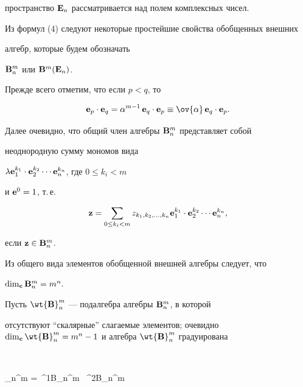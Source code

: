 пространство ${\bold E}_n$ рассматривается над полем комплексных чисел.





Из формул (4) следуют некоторые простейшие свойства обобщенных внешних


алгебр, которые будем обозначать


${\bold B}_n^m$ или ${\bold B}^m({\bold E}_n)$.


Прежде всего отметим, что если $p<q$, то


\begin{equation}


{\bold e}_p\cdot {\bold e}_q = \alpha^{m-1}\,{\bold e}_q\cdot {\bold e}_p


\equiv \ov{\alpha}\, {\bold e}_q\cdot {\bold e}_p.


\end{equation}


Далее очевидно, что общий член алгебры ${\bold B}_n^m $ представляет собой


неоднородную сумму мономов вида


$\lambda {\bold e}_1^{k_1}\cdot{\bold e}_2^{k_2}


\dotsb{\bold e}_n^{k_n}$, где $0\le k_i <m$


и ${\bold e}^0 = 1$, т.\,е.


\begin{equation}


{\bold z} = \sum_{0\le k_i <m} z_{k_1,k_2,\dotsc, k_n}


{\bold e}_1^{k_1}\cdot {\bold e}_2^{k_2}\dotsb{\bold e}_n^{k_n},


\end{equation}


если $\bold z\in\bold B^m_n$.


Из общего вида элементов обобщенной внешней алгебры следует, что


$\dim_{\bold c} {\bold B}_n^m = m^n.$





Пусть $\wt{\bold B}_n^m$ --- подалгебра алгебры ${\bold B}_n^m$, в которой


отсутствуют ``скалярные'' слагаемые элементов; очевидно $\dim_{\bold c}


\wt{\bold B}_n^m = m^n - 1$ и алгебра $\wt {\bold B}_n^m$ градуирована


$$


_n^m = \,^1{\bold B}_n^m \oplus\, ^2{\bold B}_n^m



